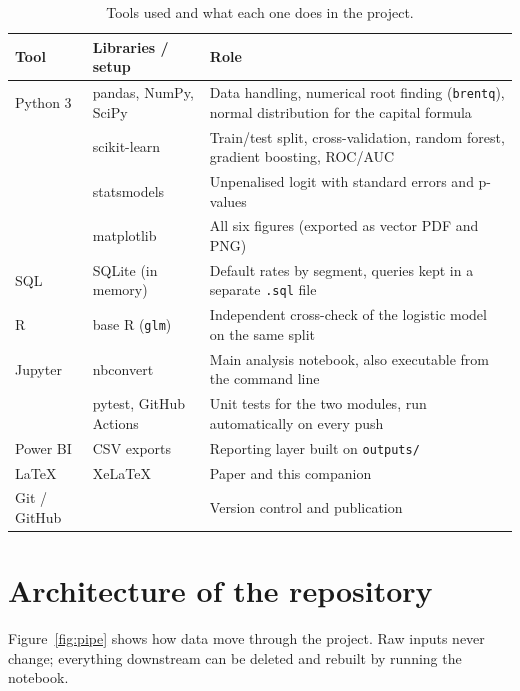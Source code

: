 \documentclass[11pt,a4paper]{article}
\newcommand{\file}[1]{\texttt{#1}}
\begin{document}
\begin{table}[H]\centering\small
\caption{Tools used and what each one does in the project.}\label{tab:tools}
\begin{tabular}{p{2.6cm}p{4.6cm}p{6.4cm}}
\toprule
Tool & Libraries / setup & Role \\
\midrule
Python 3 & pandas, NumPy, SciPy & Data handling, numerical root finding (\texttt{brentq}), normal distribution for the capital formula \\
 & scikit-learn & Train/test split, cross-validation, random forest, gradient boosting, ROC/AUC \\
 & statsmodels & Unpenalised logit with standard errors and p-values \\
 & matplotlib & All six figures (exported as vector PDF and PNG) \\
SQL & SQLite (in memory) & Default rates by segment, queries kept in a separate \file{.sql} file \\
R & base R (\texttt{glm}) & Independent cross-check of the logistic model on the same split \\
Jupyter & nbconvert & Main analysis notebook, also executable from the command line \\
 & pytest, GitHub Actions & Unit tests for the two modules, run automatically on every push \\
Power BI & CSV exports & Reporting layer built on \file{outputs/} \\
\LaTeX\ & XeLaTeX & Paper and this companion \\
Git / GitHub & & Version control and publication \\
\bottomrule
\end{tabular}
\end{table}

\section{Architecture of the repository}
Figure~\ref{fig:pipe} shows how data move through the project. Raw inputs never change; everything downstream can be deleted and rebuilt by running the notebook.
\end{document}

